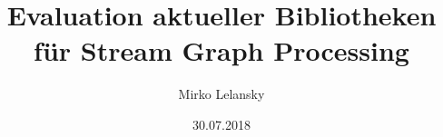 \documentclass[a4paper, fontsize=11pt]{scrreprt}
\begin{document}
\author{Mirko Lelansky}
\title{Evaluation aktueller Bibliotheken für Stream Graph Processing}
\date{30.07.2018}
\maketitle
\tableofcontents
\clearpage
\end{document}

